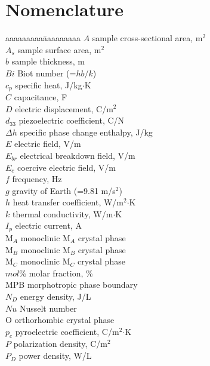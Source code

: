 \chapter*{Nomenclature}

\begin{tabbing}
aaaaaaaaa\= aaaaaaaaa\kill
$A$ \>        sample cross-sectional area, m$^2$\\
$A_s$ \>        sample surface area, m$^2$\\
$b$ \>        sample thickness, m \\
$Bi$ \>       Biot number (=$hb/k$) \\
$c_p$ \>      specific heat, J/kg$\cdot$K\\
$C$ \>        capacitance, F \\
$D$ \>        electric displacement, C/m$^2$\\
$d_{33}$ \>   piezoelectric coefficient, C/N\\
$\Delta h$ \>  specific phase change enthalpy, J/kg\\
$E$ \>        electric field, V/m\\
$E_{br}$ \>    electrical breakdown field, V/m\\
$E_{c}$ \>    coercive electric field, V/m\\
$f$ \>        frequency, Hz\\
$g$ \>          gravity of Earth (=9.81 m/s$^2$) \\
$h$    \>     heat transfer coefficient, W/m$^{2}$$\cdot$K \\
$k$ \>        thermal conductivity, W/m$\cdot$K\\
$I_p$ \>      electric current, A\\
M$_A$ \>       monoclinic M$_A$ crystal phase \\
M$_B$ \>       monoclinic M$_B$ crystal phase \\
M$_C$ \>       monoclinic M$_C$ crystal phase \\
$mol\%$\>    molar fraction, \% \\
MPB \>         morphotropic phase boundary \\
$N_D$ \>      energy density, J/L\\
$Nu$ \>     Nusselt number \\
O \>       orthorhombic crystal phase \\
$p_c$ \>      pyroelectric coefficient, C/m$^2$$\cdot$K\\
$P$ \>        polarization density, C/m$^2$\\
$P_D$ \>      power density, W/L\\

\end{tabbing}
